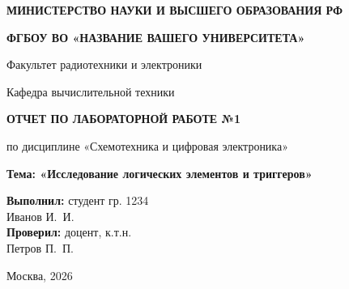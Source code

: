 \begin{titlepage}
    \centering
    {\bfseries МИНИСТЕРСТВО НАУКИ И ВЫСШЕГО ОБРАЗОВАНИЯ РФ\par}
    {\bfseries ФГБОУ ВО «НАЗВАНИЕ ВАШЕГО УНИВЕРСИТЕТА»\par}
    \vspace{1cm}
    Факультет радиотехники и электроники\par
    Кафедра вычислительной техники\par
    \vspace{3cm}
    
    {\bfseries\large ОТЧЕТ ПО ЛАБОРАТОРНОЙ РАБОТЕ №1\par}
    \vspace{0.5cm}
    {\large по дисциплине «Схемотехника и цифровая электроника»\par}
    {\bfseries Тема: «Исследование логических элементов и триггеров»\par}
    
    \vspace{3.5cm}
    \begin{flushright}
        \textbf{Выполнил:} студент гр. 1234\\
        Иванов И.~И.\\[0.5cm]
        \textbf{Проверил:} доцент, к.т.н.\\
        Петров П.~П.
    \end{flushright}
    
    \vfill
    {Москва, 2026}
\end{titlepage}
